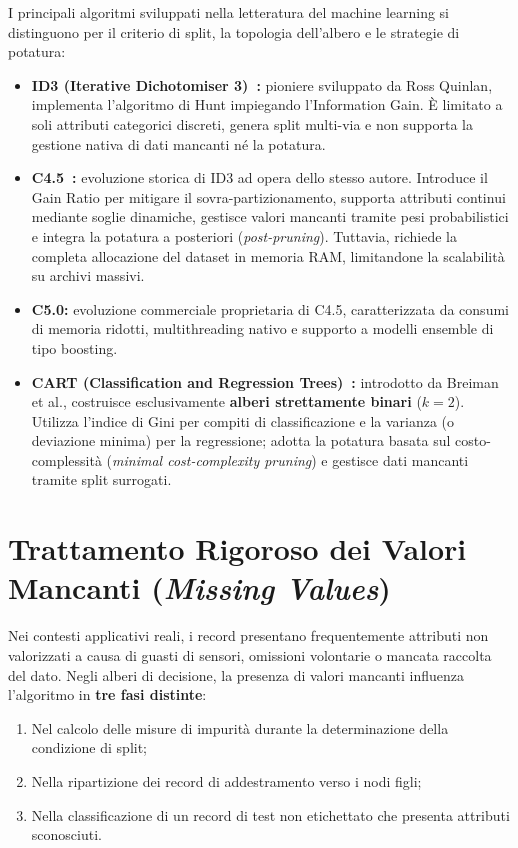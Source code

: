 I principali algoritmi sviluppati nella letteratura del machine learning si distinguono per il criterio di split, la topologia dell'albero e le strategie di potatura:
\begin{itemize}
    \item \textbf{ID3 (Iterative Dichotomiser 3)~\cite{quinlan1986}:} pioniere sviluppato da Ross Quinlan, implementa l'algoritmo di Hunt impiegando l'Information Gain. È limitato a soli attributi categorici discreti, genera split multi-via e non supporta la gestione nativa di dati mancanti né la potatura.
    \item \textbf{C4.5~\cite{quinlan1993}:} evoluzione storica di ID3 ad opera dello stesso autore. Introduce il Gain Ratio per mitigare il sovra-partizionamento, supporta attributi continui mediante soglie dinamiche, gestisce valori mancanti tramite pesi probabilistici e integra la potatura a posteriori (\textit{post-pruning}). Tuttavia, richiede la completa allocazione del dataset in memoria RAM, limitandone la scalabilità su archivi massivi.
    \item \textbf{C5.0:} evoluzione commerciale proprietaria di C4.5, caratterizzata da consumi di memoria ridotti, multithreading nativo e supporto a modelli ensemble di tipo boosting.
    \item \textbf{CART (Classification and Regression Trees)~\cite{breiman1984}:} introdotto da Breiman et al., costruisce esclusivamente \textbf{alberi strettamente binari} ($k=2$). Utilizza l'indice di Gini per compiti di classificazione e la varianza (o deviazione minima) per la regressione; adotta la potatura basata sul costo-complessità (\textit{minimal cost-complexity pruning}) e gestisce dati mancanti tramite split surrogati.
\end{itemize}

\FloatBarrier
\section{Trattamento Rigoroso dei Valori Mancanti (\textit{Missing Values})}
\label{sec:dm-missing-values}

Nei contesti applicativi reali, i record presentano frequentemente attributi non valorizzati a causa di guasti di sensori, omissioni volontarie o mancata raccolta del dato. Negli alberi di decisione, la presenza di valori mancanti influenza l'algoritmo in \textbf{tre fasi distinte}:
\begin{enumerate}
    \item Nel calcolo delle misure di impurità durante la determinazione della condizione di split;
    \item Nella ripartizione dei record di addestramento verso i nodi figli;
    \item Nella classificazione di un record di test non etichettato che presenta attributi sconosciuti.
\end{enumerate}

